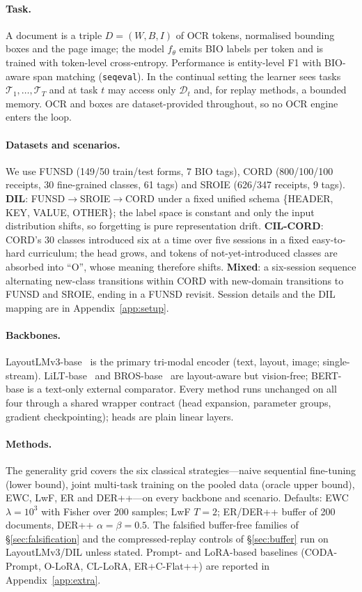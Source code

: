 \documentclass{article}
\begin{document}
\paragraph{Task.} A document is a triple $D=(W,B,I)$ of OCR tokens, normalised bounding boxes and the page image; the model $f_\theta$ emits BIO labels per token and is trained with token-level cross-entropy. Performance is entity-level F1 with BIO-aware span matching (\texttt{seqeval}). In the continual setting the learner sees tasks $\mathcal{T}_1,\dots,\mathcal{T}_T$ and at task $t$ may access only $\mathcal{D}_t$ and, for replay methods, a bounded memory. OCR and boxes are dataset-provided throughout, so no OCR engine enters the loop.

\paragraph{Datasets and scenarios.} We use FUNSD (149/50 train/test forms, 7 BIO tags), CORD (800/100/100 receipts, 30 fine-grained classes, 61 tags) and SROIE (626/347 receipts, 9 tags). \textbf{DIL}: FUNSD$\rightarrow$SROIE$\rightarrow$CORD under a fixed unified schema \{HEADER, KEY, VALUE, OTHER\}; the label space is constant and only the input distribution shifts, so forgetting is pure representation drift. \textbf{CIL-CORD}: CORD's 30 classes introduced six at a time over five sessions in a fixed easy-to-hard curriculum; the head grows, and tokens of not-yet-introduced classes are absorbed into ``O'', whose meaning therefore shifts. \textbf{Mixed}: a six-session sequence alternating new-class transitions within CORD with new-domain transitions to FUNSD and SROIE, ending in a FUNSD revisit. Session details and the DIL mapping are in Appendix~\ref{app:setup}.

\paragraph{Backbones.} LayoutLMv3-base~\citep{huang2022layoutlmv3} is the primary tri-modal encoder (text, layout, image; single-stream). LiLT-base~\citep{wang2022lilt} and BROS-base~\citep{hong2022bros} are layout-aware but vision-free; BERT-base is a text-only external comparator. Every method runs unchanged on all four through a shared wrapper contract (head expansion, parameter groups, gradient checkpointing); heads are plain linear layers.

\paragraph{Methods.} The generality grid covers the six classical strategies---naive sequential fine-tuning (lower bound), joint multi-task training on the pooled data (oracle upper bound), EWC, LwF, ER and DER++---on every backbone and scenario. Defaults: EWC $\lambda{=}10^3$ with Fisher over 200 samples; LwF $T{=}2$; ER/DER++ buffer of 200 documents, DER++ $\alpha{=}\beta{=}0.5$. The falsified buffer-free families of \S\ref{sec:falsification} and the compressed-replay controls of \S\ref{sec:buffer} run on LayoutLMv3/DIL unless stated. Prompt- and LoRA-based baselines (CODA-Prompt, O-LoRA, CL-LoRA, ER+C-Flat++) are reported in Appendix~\ref{app:extra}.
\end{document}
